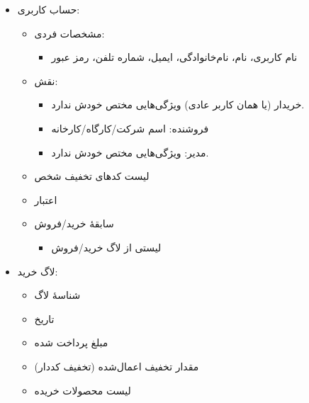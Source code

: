 \documentclass[]{article}
\begin{document}
\begin{itemize}

\item
حساب کاربری:

\begin{itemize}
\item
مشخصات فردی:

\begin{itemize}[label=$\blacksquare$]
\item
نام کاربری، نام، نام‌خانوادگی، ایمیل، شماره تلفن، رمز عبور 
\end{itemize}
\item
نقش:

\begin{itemize}[label=$\blacksquare$]
\item
خریدار (یا همان کاربر عادی) ویژگی‌هایی مختص خودش ندارد.	

\item
فروشنده: اسم شرکت/کارگاه/کارخانه

\item
مدیر: ویژگی‌هایی مختص خودش ندارد.

\end{itemize}

\item
لیست کدهای تخفیف شخص

\item
اعتبار

\item
سابقهٔ خرید/فروش

\begin{itemize}[label=$\blacksquare$]
\item
لیستی از لاگ خرید/فروش
\end{itemize}

\end{itemize}


\item
لاگ خرید:

\begin{itemize}

\item
شناسهٔ لاگ

\item
تاریخ

\item
مبلغ پرداخت شده

\item
مقدار تخفیف اعمال‌شده (تخفیف کددار)

\item
لیست محصولات خریده



\end{itemize}
\end{itemize}
\end{document}
